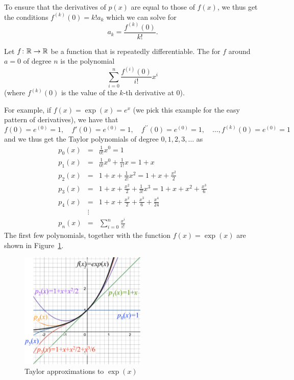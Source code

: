 To ensure that the derivatives of $p(x)$ are equal to those of $f(x)$, we
thus get the conditions $f^{(k)}(0)=k! a_k$ which we can solve for
\[
a_k=\frac{f^{(k)}(0)}{k!}.
\]
\begin{defn}
Let $f\colon{\mathbb R}\to{\mathbb R}$ be a function that is repeatedly differentiable.
The 
for $f$ around $a=0$ of degree $n$ is the polynomial
\[
\sum_{i=0}^n\frac{f^{(i)}(0)}{i!} x^i
\]
(where $f^{(k)}(0)$ is the value of the $k$-th derivative at $0$).
\end{defn}
For example, if $f(x)=\exp(x)=e^x$ (we pick this example for the easy pattern of
derivatives), we have that
\[
f(0)=e^(0)=1,\quad
f'(0)=e^(0)=1,\quad
f^{\prime\prime}(0)=e^(0)=1,\quad\ldots,
f^{(k)}(0)=e^(0)=1
\]
and we thus get the Taylor polynomials of degree $0,1,2,3,\ldots$ as
\begin{eqnarray*}
p_0(x)&=&\frac{1}{0!}x^0=1\\
p_1(x)&=&\frac{1}{0!}x^0+\frac{1}{1!}x=1+x\\
p_2(x)&=&1+x+\frac{1}{2!}x^2=1+x+\frac{x^2}{2}\\
p_3(x)&=&1+x+\frac{x^2}{2}+\frac{1}{3!}x^3=1+x+x^2+\frac{x^3}{6}\\
p_4(x)&=&1+x+\frac{x^2}{2}+\frac{x^3}{6}+\frac{x^4}{24}\\
&\vdots&\\
p_n(x)&=&\sum_{i=0}^n \frac{x^i}{i!}
\end{eqnarray*}
The first few polynomials, together with the function $f(x)=\exp(x)$ are
shown in Figure~\ref{figtayexp}.
\begin{figure}
\begin{center}
\includegraphics[width=6cm]{pic/TaylorExp.pdf}
\end{center}
\caption{Taylor approximations to $\exp(x)$}
\label{figtayexp}
\end{figure}


